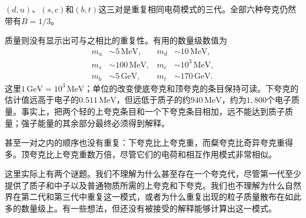 \((d,u)\)、\((s,c)\)和\((b,t)\)这三对是重复相同电荷模式的三代。全部六种夸克仍然带有\(B=1/3\)。

\begin{classroomqa}
\end{classroomqa}

质量则没有显示出可与之相比的重复性。有用的数量级数值为
\begin{align}
m_u &\sim 5\,\mathrm{MeV},
&
m_d &\sim 10\,\mathrm{MeV},
\\
m_s &\sim 100\,\mathrm{MeV},
&
m_c &\sim 10^3\,\mathrm{MeV},
\\
m_b &\sim 5\,\mathrm{GeV},
&
m_t &\sim 170\,\mathrm{GeV}.
\end{align}
这里\(1\,\mathrm{GeV}=10^3\,\mathrm{MeV}\)；单位的改变使底夸克和顶夸克的条目保持可读。下夸克的估计值远高于电子的\(0.511\,\mathrm{MeV}\)，但远低于质子的约\(940\,\mathrm{MeV}\)，约为\(1{,}800\)个电子质量。事实上，把两个轻的上夸克条目和一个下夸克条目相加，远不能达到质子质量；强子能量的其余部分最终必须得到解释。


甚至一对之内的顺序也没有重复：下夸克比上夸克重，而粲夸克比奇异夸克重得多。顶夸克比上夸克重数万倍，尽管它们的电荷和相互作用模式非常相似。

这里实际上有两个谜题。我们不理解为什么甚至存在一个夸克代，尽管第一代至少提供了质子和中子以及普通物质所需的上夸克和下夸克。我们也不理解为什么自然界在第二代和第三代中重复这一模式，或者为什么重复出现的粒子质量散布在如此多的数量级上。有一些想法，但还没有被接受的解释能够计算出这一模式。

\begin{classroomqa}
\end{classroomqa}

\begin{classroomqa}
\end{classroomqa}

